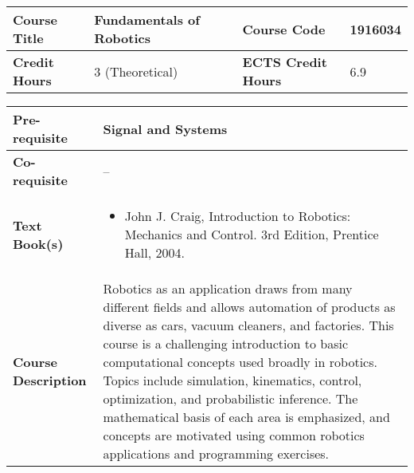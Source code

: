 \documentclass[12pt]{article}
\begin{document}
\bigskip
\bigskip


\begin{minipage}{\textwidth}
\begin{tabularx}{\textwidth}{|l|X|l|X|}
\hline
\textbf{Course Title}       &   Fundamentals of Robotics & \textbf{Course Code}       &  1916034 \\ \hline
\textbf{Credit Hours}       &  3 (Theoretical) & \textbf{ECTS Credit Hours}       &   6.9 \\ \hline
\end{tabularx}

\begin{tabularx}{\textwidth}{|l|X|}
\hline
\textbf{Pre-requisite}      &  Signal and Systems \\ \hline
\textbf{Co-requisite}       &  -- \\ \hline
\textbf{Text Book(s)}      & \begin{minipage}{.70\textwidth}
					\begin{itemize} \itemsep-0.4em
						\vspace{3mm}
						\item John J. Craig, Introduction to Robotics: Mechanics and Control. 3rd Edition, Prentice Hall, 2004.
						\vspace{3mm}
					\end{itemize}
				\end{minipage}  \\ \hline
\textbf{Course Description} & \begin{minipage}{.70\textwidth}
					\vspace{3mm}
					Robotics as an application draws from many different fields and allows automation of products as diverse as cars, vacuum cleaners, and factories. This course is a challenging introduction to basic computational concepts used broadly in robotics. Topics include simulation, kinematics, control, optimization, and probabilistic inference. The mathematical basis of each area is emphasized, and concepts are motivated using common robotics applications and programming exercises.

					\vspace{3mm}
					\end{minipage} \\ \hline
\end{tabularx}
\end{minipage}


\bigskip
\bigskip
\end{document}

